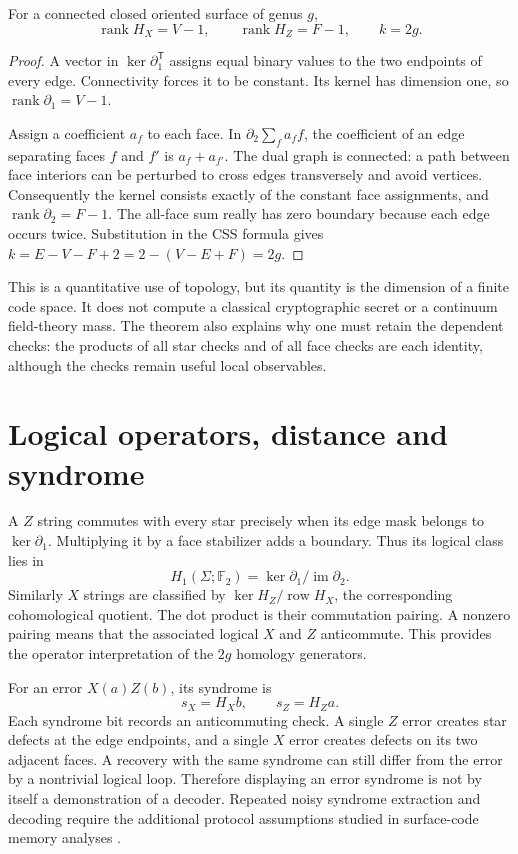 \begin{theorem}
For a connected closed oriented surface of genus $g$,
\[
 \operatorname{rank}H_X=V-1,\qquad
 \operatorname{rank}H_Z=F-1,\qquad k=2g.
\]
\end{theorem}
\begin{proof}
A vector in $\ker\partial_1^{\mathsf T}$ assigns equal binary
values to the two endpoints of every edge.  Connectivity forces it
to be constant.  Its kernel has dimension one, so
$\operatorname{rank}\partial_1=V-1$.

Assign a coefficient $a_f$ to each face.  In
$\partial_2\sum_fa_ff$, the coefficient of an edge separating faces
$f$ and $f'$ is $a_f+a_{f'}$.  The dual graph is connected: a path
between face interiors can be perturbed to cross edges transversely
and avoid vertices.  Consequently the kernel consists exactly of
the constant face assignments, and
$\operatorname{rank}\partial_2=F-1$.  The all-face sum really has
zero boundary because each edge occurs twice.  Substitution in the
CSS formula gives $k=E-V-F+2=2-(V-E+F)=2g$.
\end{proof}

This is a quantitative use of topology, but its quantity is the dimension
of a finite code space.  It does not compute a classical cryptographic
secret or a continuum field-theory mass.  The theorem also explains why
one must retain the dependent checks: the products of all star checks
and of all face checks are each identity, although the checks remain
useful local observables.

\section{Logical operators, distance and syndrome}

A $Z$ string commutes with every star precisely when its edge mask belongs
to $\ker\partial_1$.  Multiplying it by a face stabilizer adds a boundary.
Thus its logical class lies in
\[
 H_1(\Sigma;\mathbb F_2)=\ker\partial_1/\operatorname{im}\partial_2.
\]
Similarly $X$ strings are classified by
$\ker H_Z/\operatorname{row}H_X$, the corresponding cohomological
quotient.  The dot product is their commutation pairing.  A nonzero pairing
means that the associated logical $X$ and $Z$ anticommute.  This provides
the operator interpretation of the $2g$ homology generators.

For an error $X(a)Z(b)$, its syndrome is
\[
 s_X=H_Xb,\qquad s_Z=H_Za.
\]
Each syndrome bit records an anticommuting check.  A single $Z$ error
creates star defects at the edge endpoints, and a single $X$ error creates
defects on its two adjacent faces.  A recovery with the same syndrome
can still differ from the error by a nontrivial logical loop.  Therefore
displaying an error syndrome is not by itself a demonstration of a decoder.
Repeated noisy syndrome extraction and decoding require the additional
protocol assumptions studied in surface-code memory analyses
\cite{QSDennis2002}.

